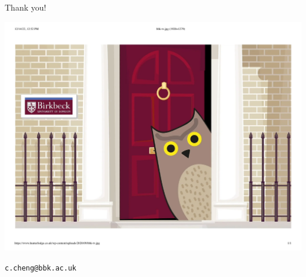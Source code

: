 \documentclass[
  10pt,
  ignorenonframetext,
]{beamer}
\begin{document}
\begin{frame}
\vspace{0.5cm}
\begin{center}
Thank you!
\end{center}
\vspace{0.3cm}

\begin{center}\includegraphics[width=0.7\linewidth]{Figs/bbk_tv} \end{center}
\vspace{0.3cm}
\begin{center}
\texttt{c.cheng@bbk.ac.uk}
\end{center}
\end{frame}
\end{document}

